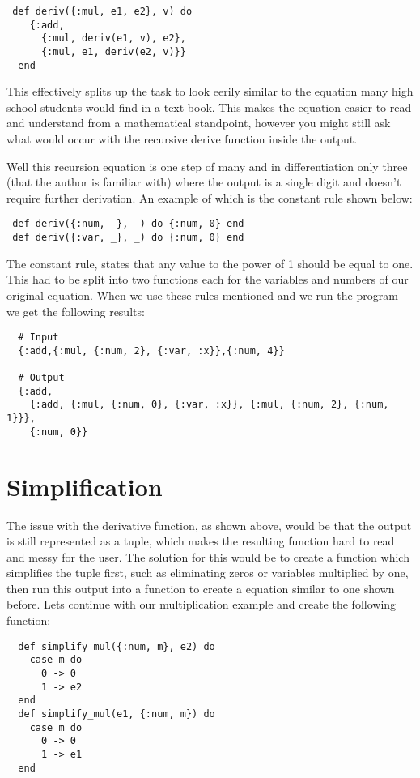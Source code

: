 \documentclass[a4paper,11pt]{article}
\begin{document}
\begin{verbatim}
 def deriv({:mul, e1, e2}, v) do
    {:add,
      {:mul, deriv(e1, v), e2},
      {:mul, e1, deriv(e2, v)}}
  end
\end{verbatim}

This effectively splits up the task to look eerily similar to the equation many high school students would find in a text book. This makes the equation easier to read and understand from a mathematical standpoint, however you might still ask what would occur with the recursive derive function inside the output. 

Well this recursion equation is one step of many and in differentiation only three (that the author is familiar with) where the output is a single digit and doesn't require further derivation. An example of which is the constant rule shown below:

\begin{verbatim}
 def deriv({:num, _}, _) do {:num, 0} end
 def deriv({:var, _}, _) do {:num, 0} end
\end{verbatim}

The constant rule, states that any value to the power of 1 should be equal to one. This had to be split into two functions each for the variables and numbers of our original equation. When we use these rules mentioned and we run the program we get the following results:

\begin{verbatim}
  # Input
  {:add,{:mul, {:num, 2}, {:var, :x}},{:num, 4}}

  # Output
  {:add, 
    {:add, {:mul, {:num, 0}, {:var, :x}}, {:mul, {:num, 2}, {:num, 1}}},
    {:num, 0}}
\end{verbatim}

\section*{Simplification}

The issue with the derivative function, as shown above, would be that the output is still represented as a tuple, which makes the resulting function hard to read and messy for the user. The solution for this would be to create a function which simplifies the tuple first, such as eliminating zeros or variables multiplied by one, then run this output into a function to create a equation similar to one shown before. Lets continue with our multiplication example and create the following function:

\begin{verbatim}
  def simplify_mul({:num, m}, e2) do
    case m do
      0 -> 0
      1 -> e2
  end
  def simplify_mul(e1, {:num, m}) do
    case m do
      0 -> 0
      1 -> e1
  end
\end{verbatim}
\end{document}
